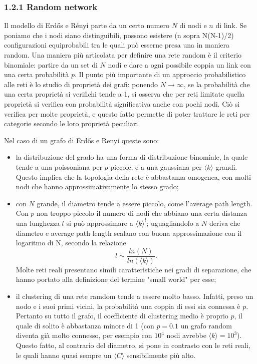\subsubsection{1.2.1 Random network}
Il modello di Erdős e Rényi parte da un certo numero $N$ di nodi e $n$ di link. Se poniamo che i nodi siano distinguibili, possono esistere (n sopra N(N-1)/2) 
configurazioni equiprobabili tra le quali può esserne presa una in maniera random. Una maniera più articolata per definire una rete random è il criterio binomiale: partire da un set di $N$ nodi e dare a ogni possibile coppia un link con una certa probabilità  $p$. 
Il punto più importante di un approccio probabilistico alle reti è lo studio di proprietà dei grafi: ponendo $N \rightarrow \infty$, se la probabilità che una certa proprietà si verifichi tende a 1, si osserva che per reti limitate quella proprietà si verifica con probabilità significativa anche con pochi nodi. Ciò si verifica per molte proprietà, e questo fatto permette di poter trattare le reti per categorie secondo le loro proprietà peculiari.

Nel caso di un grafo di Erdős e Renyi queste sono:

\begin{itemize}
	\item la distribuzione del grado ha una forma di distribuzione binomiale, la quale tende a una poissoniana per $p$ piccole, e a una gaussiana per $\langle k \rangle$ grandi. Questo implica che la topologia della rete è abbastanza omogenea, con molti nodi che hanno approssimativamente lo stesso grado;
	
	\item con $N$ grande, il diametro tende a essere piccolo, come l'average path length. Con $p$ non troppo piccolo il numero di nodi che abbiano una certa distanza una lunghezza $l$ si può approssimare a $\langle k\rangle^l$; uguagliandolo a $N$ deriva che diametro e average path length scalano con buona approssimazione con il logaritmo di N, secondo la relazione
	\begin{equation}
	\label{eq:lunghezze}
	l \sim \frac{ln(N)}{ln(\langle k \rangle)}. 	 
	\end{equation}
	Molte reti reali presentano simili caratteristiche nei gradi di separazione, che hanno portato alla definizione del termine "small world" per esse;
	
	\item il clustering di una rete ramdom tende a essere molto basso. Infatti, preso un nodo e i suoi primi vicini, la probabilità una coppia di essi sia connessa è $p$. Pertanto su tutto il grafo, il coefficiente di clustering medio è proprio $p$, il quale di solito è abbastanza minore di 1 (con $p = 0.1$ un grafo random diventa già molto connesso, per esempio con $10^4$ nodi avrebbe $\langle k\rangle = 10^3$). Questo fatto, al contrario del diametro, si pone in contrasto con le reti reali, le quali hanno quasi sempre un $\langle C \rangle$ sensibilmente più alto.
\end{itemize}

